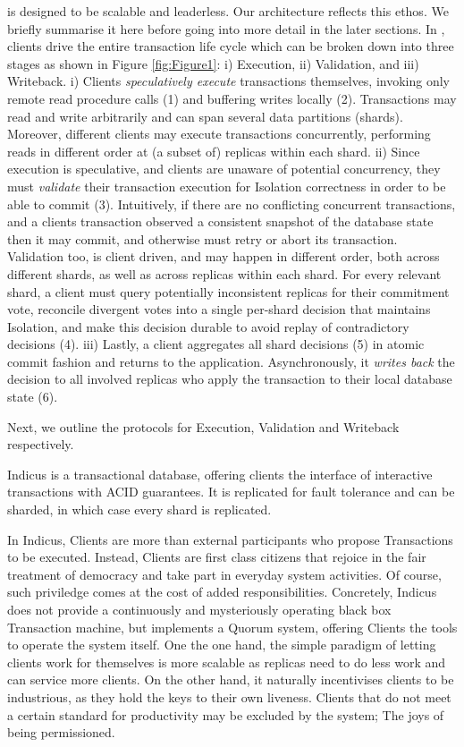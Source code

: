 \sys is designed to be scalable and leaderless. Our architecture reflects this ethos. We briefly summarise it here before going into more detail in the later sections. 
In \sys, clients drive the entire transaction life cycle which can be broken down into three stages as shown in Figure \ref{fig:Figure1}: i) Execution, ii) Validation, and iii) Writeback. 
i) Clients \textit{speculatively execute} transactions themselves, invoking only remote read procedure calls (1) and buffering writes locally (2). Transactions may read and write arbitrarily and can span several data partitions (shards). Moreover, different clients may execute transactions concurrently, performing reads in different order at (a subset of) replicas within each shard. 
ii) Since execution is speculative, and clients are unaware of potential concurrency, they must \textit{validate} their transaction execution for Isolation correctness in order to be able to commit (3). Intuitively, if there are no conflicting concurrent transactions, and a clients transaction observed a consistent snapshot of the database state then it may commit, and otherwise must retry or abort its transaction. Validation too, is client driven, and may happen in different order, both across different shards, as well as across replicas within each shard. For every relevant shard, a client must query potentially inconsistent replicas for their commitment vote, reconcile divergent votes into a single per-shard decision that maintains Isolation, and make this decision durable to avoid replay of contradictory decisions (4). 
iii) Lastly, a client aggregates all shard decisions (5) in atomic commit fashion and returns to the application. Asynchronously, it \textit{writes back} the decision to all involved replicas who apply the transaction to their local database state (6).

Next, we outline the protocols for Execution, Validation and Writeback respectively. 

\iffalse
{}
Indicus is a transactional database, offering clients the interface of interactive transactions with ACID guarantees. It is replicated for fault tolerance and can be sharded, in which case every shard is replicated. 

In Indicus, Clients are more than external participants who propose Transactions to be executed. Instead, Clients are first class citizens that rejoice in the fair treatment of democracy and take part in everyday system activities. Of course, such priviledge comes at the cost of added responsibilities. Concretely, Indicus does not provide a continuously and mysteriously operating black box Transaction machine, but implements a Quorum system, offering Clients the tools to operate the system itself. One the one hand, the simple paradigm of letting clients work for themselves is more scalable as replicas need to do less work and can service more clients. On the other hand, it naturally incentivises clients to be industrious, as they hold the keys to their own liveness. Clients that do not meet a certain standard for productivity may be excluded by the system; The joys of being permissioned.

